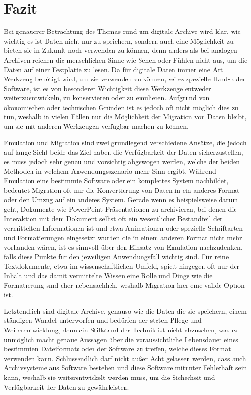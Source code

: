 \documentclass[conference,compsoc,final,a4paper]{IEEEtran}
\begin{document}
\section{Fazit}
Bei genauerer Betrachtung des Themas rund um digitale Archive wird klar, wie wichtig es ist Daten nicht nur zu speichern, sondern auch eine Möglichkeit zu bieten sie in Zukunft noch verwenden zu können, denn anders als bei analogen Archiven reichen die menschlichen Sinne wie Sehen oder Fühlen nicht aus, um die Daten auf einer Festplatte zu lesen. Da für digitale Daten immer eine Art Werkzeug benötigt wird, um sie verwenden zu können, sei es spezielle Hard- oder Software, ist es von besonderer Wichtigkeit diese Werkzeuge entweder weiterzuentwickeln, zu konservieren oder zu emulieren. Aufgrund von ökonomischen oder technischen Gründen ist es jedoch oft nicht möglich dies zu tun, weshalb in vielen Fällen nur die Möglichkeit der Migration von Daten bleibt, um sie mit anderen Werkzeugen verfügbar machen zu können.

Emulation und Migration sind zwei grundlegend verschiedene Ansätze, die jedoch auf lange Sicht beide das Ziel haben die Verfügbarkeit der Daten sicherzustellen, es muss jedoch sehr genau und vorsichtig abgewogen werden, welche der beiden Methoden in welchem Anwendungsszenario mehr Sinn ergibt. Während Emulation eine bestimmte Software oder ein komplettes System nachbildet, bedeutet Migration oft nur die Konvertierung von Daten in ein anderes Format oder den Umzug auf ein anderes System. Gerade wenn es beispielsweise darum geht, Dokumente wie PowerPoint Präsentationen zu archivieren, bei denen die Interaktion mit dem Dokument selbst oft ein wesentlicher Bestandteil der vermittelten Informationen ist und etwa Animationen oder spezielle Schriftarten und Formatierungen eingesetzt wurden die in einem anderen Format nicht mehr vorhanden wären, ist es sinnvoll über den Einsatz von Emulation nachzudenken, falls diese Punkte für den jeweiligen Anwendungsfall wichtig sind. Für reine Textdokumente, etwa im wissenschaftlichen Umfeld, spielt hingegen oft nur der Inhalt und das damit vermittelte Wissen eine Rolle und Dinge wie die Formatierung sind eher nebensächlich, weshalb Migration hier eine valide Option ist.

Letztendlich sind digitale Archive, genauso wie die Daten die sie speichern, einem ständigen Wandel unterworfen und bedürfen der steten Pflege und Weiterentwicklung, denn ein Stillstand der Technik ist nicht abzusehen, was es unmöglich macht genaue Aussagen über die voraussichtliche Lebensdauer eines bestimmten Dateiformats oder der Software zu treffen, welche dieses Format verwenden kann. Schlussendlich darf nicht außer Acht gelassen werden, dass auch Archivsysteme aus Software bestehen und diese Software mitunter Fehlerhaft sein kann, weshalb sie weiterentwickelt werden muss, um die Sicherheit und Verfügbarkeit der Daten zu gewährleisten.
\end{document}
